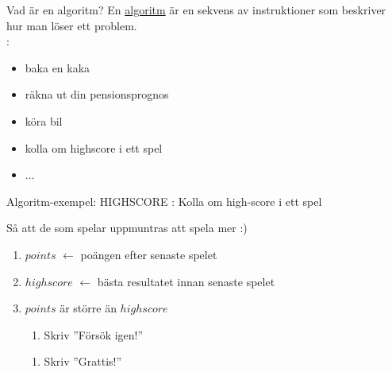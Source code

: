 \begin{Slide}{Vad är en algoritm?}
En \href{https://sv.wikipedia.org/wiki/Algoritm}{algoritm} är en sekvens av instruktioner som beskriver \\hur man löser ett problem.\\
\vspace{1em}
: 
\begin{itemize}
\item	 baka en kaka 
\pause\item räkna ut din pensionsprognos 
\pause\item köra bil 
\pause\item kolla om highscore i ett spel 
\item ...
\end{itemize}

\end{Slide}



\begin{Slide}{Algoritm-exempel: HIGHSCORE}
: Kolla om high-score i ett spel \\ \vspace{1em}

 \pause Så att de som spelar uppmuntras att spela mer :) \\ \vspace{1em}

\pause
\begin{enumerate}
\item $points$ $\leftarrow$ poängen efter senaste spelet
\item $highscore$ $\leftarrow$ bästa resultatet innan senaste spelet
\item {} $points$ är större än $highscore$ 
\begin{enumerate}[ ~~]
\item  Skriv ''Försök igen!''
\end{enumerate}
\begin{enumerate}[ ~~]
\item  Skriv ''Grattis!''
\end{enumerate}
\end{enumerate}
\pause
\scriptsize {}
\end{Slide}


